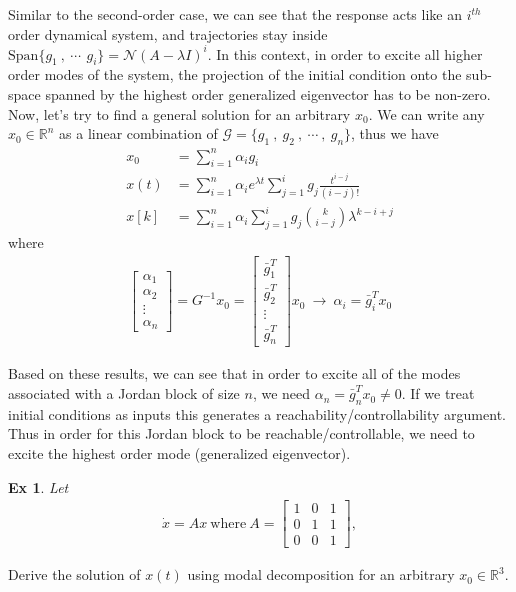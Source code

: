 \documentclass[twoside]{article}
\newtheorem{exmp}[theorem]{Ex}
\begin{document}
%
Similar to the second-order case, we can see that the response acts like an $i^{th}$ order dynamical system, and trajectories stay inside
$\mathrm{Span} \lbrace g_1 \ , \ \cdots \, \ g_i \rbrace = \mathcal{N}(A - \lambda I)^i$. In this context, in order to excite all higher order modes 
of the system, the projection of the initial condition onto the sub-space spanned by the highest order generalized eigenvector has to be non-zero. Now, 
let's try to find a general solution for an arbitrary $x_0$. We can write any $x_0 \in \mathbb{R}^{n}$ as a linear combination of 
$\mathcal{G} = \lbrace g_1 \ , \ g_2 \ , \ \cdots \ , \ g_n \rbrace$, thus we have
%
\begin{align*}
x_0 &= \sum\limits_{i=1}^n \alpha_i g_i
\\[1ex]
x(t) &= \sum\limits_{i=1}^n \alpha_i e^{\lambda t} \sum\limits_{j=1}^{i}  g_j \frac{t^{i-j}}{(i-j)!}
\\[1ex]
x[k] &= \sum\limits_{i=1}^n \alpha_i \sum\limits_{j=1}^{i}  g_j \binom{k}{i-j} \lambda^{k-i+j}  
\end{align*}
%
where 
\begin{align*}
\begin{bmatrix} \alpha_1 \\ \alpha_2 \\ \vdots \\ \alpha_n \end{bmatrix} = G^{-1} x_0 
= \begin{bmatrix} \bar{g}_1^T \\ \bar{g}_2^T \\ \vdots \\ \bar{g}_n^T \end{bmatrix} x_0 \ \rightarrow \ \alpha_i = \bar{g}_i^T x_0
\end{align*}

Based on these results, we can see that in order to excite all of the modes associated with a Jordan block of size $n$, 
we need $\alpha_n = \bar{g}_n^T x_0 \neq 0$. If we treat initial conditions as inputs this generates a reachability/controllability argument. 
Thus in order for this Jordan block to be reachable/controllable, we need to excite the highest order mode (generalized eigenvector).

\begin{exmp}
    Let 
\begin{align*}
\dot{x} = A x \ \mathrm{where} \  A = \begin{bmatrix} 1 & 0 & 1 \\ 0 & 1 & 1 \\ 0 & 0 & 1 \end{bmatrix} , 
\end{align*}
\end{exmp}
%
Derive the solution of $x(t)$ using modal decomposition for an arbitrary $x_0 \in \mathbb{R}^3$.
\end{document}
